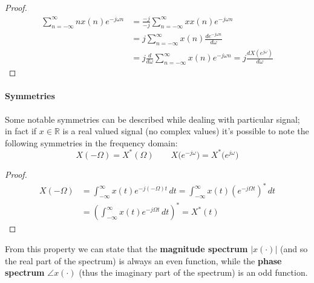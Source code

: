 		\begin{proof}
		\begin{align*}
			\sum_{n=-\infty}^\infty n x(n) e^{-j\omega n} & = \frac{-j}{-j}\sum_{n=-\infty}^\infty x x(n) e^{-j\omega n} \\
			& = j \sum_{n=-\infty}^\infty x(n) \frac{de^{-j\omega n}}{d\omega} \\
			& = j \frac{d}{d\omega}\sum_{n=-\infty}^\infty x(n) e^{-j\omega n} = j \frac{dX(e^{j\omega})}{d\omega}
		\end{align*}
		\end{proof}
		
	\paragraph{Symmetries} Some notable symmetries can be described while dealing with particular signal; in fact if $x\in \mathds R$ is a real valued signal (no complex values) it's possible to note the following symmetries in the frequency domain:
	\begin{equation}
		X(-\Omega) = X^*(\Omega) \qquad X\big(e^{-j\omega}\big) = X^*\big(e^{j\omega}\big)
	\end{equation}
		\begin{proof}
		\begin{align*}
			X(-\Omega) & = \int_{-\infty}^\infty x(t) e^{-j (-\Omega) t} \, dt = \int_{-\infty}^\infty x(t) \left(e^{-j\Omega t}\right)^* \, dt \\ 
			& = \left( \int_{-\infty}^\infty x(t) e^{-j\Omega t} \, dt\right)^* = X^*(t)
		\end{align*}
		\end{proof}
		From this property we can state that the \textbf{magnitude spectrum} $|x(\cdot)|$ (and so the real part of the spectrum) is always an even function, while the \textbf{phase spectrum} $\angle x(\cdot)$ (thus the imaginary part of the spectrum) is an odd function. \vspace{3mm}
		
